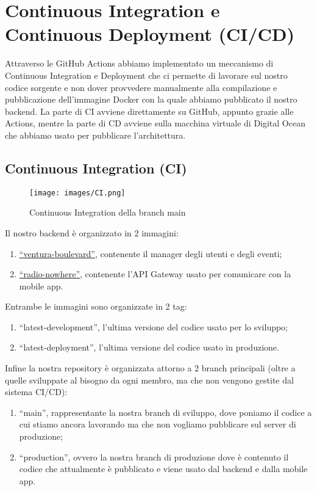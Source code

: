 \section{Continuous Integration e Continuous Deployment (CI/CD)}
Attraverso le GitHub Actions abbiamo implementato un meccanismo di Continuous Integration e Deployment che ci permette di lavorare sul nostro codice sorgente e non dover provvedere manualmente alla compilazione e pubblicazione dell'immagine Docker con la quale abbiamo pubblicato il nostro backend. La parte di CI avviene direttamente su GitHub, appunto grazie alle Actions, mentre la parte di CD avviene sulla macchina virtuale di Digital Ocean che abbiamo usato per pubblicare l'architettura.
\subsection{Continuous Integration (CI)}
\begin{figure}[h!]
  \centering
  \texttt{[image: images/CI.png]}
  \caption{Continuous Integration della branch main}
\end{figure}
Il nostro backend è organizzato in 2 immagini:
\begin{enumerate}
  \item \href{https://hub.docker.com/repository/docker/freddy153/ventura_boulevard/general}{``ventura-boulevard''}, contenente il manager degli utenti e degli eventi;
  \item \href{https://hub.docker.com/repository/docker/freddy153/radio_nowhere/general}{``radio-nowhere''}, contenente l'API Gateway usato per comunicare con la mobile app.
\end{enumerate}
Entrambe le immagini sono organizzate in 2 tag:
\begin{enumerate}
  \item ``latest-development'', l'ultima versione del codice usato per lo sviluppo;
  \item ``latest-deployment'', l'ultima versione del codice usato in produzione.
\end{enumerate}
Infine la nostra repository è organizzata attorno a 2 branch principali (oltre a quelle sviluppate al bisogno da ogni membro, ma che non vengono gestite dal sistema CI/CD):
\begin{enumerate}
  \item ``main'', rappresentante la nostra branch di sviluppo, dove poniamo il codice a cui stiamo ancora lavorando ma che non vogliamo pubblicare sul server di produzione;
  \item  ``production'', ovvero la nostra branch di produzione dove è contenuto il codice che attualmente è pubblicato e viene usato dal backend e dalla mobile app.
\end{enumerate}
